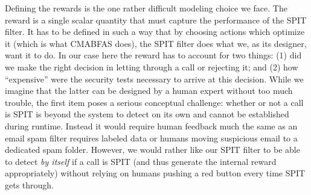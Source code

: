 \documentclass{llncs}
\begin{document}
Defining the rewards is the one rather difficult modeling choice we face. The reward
is a single scalar quantity that must capture the performance of the SPIT filter. It
has to be defined in such a way that by choosing actions which optimize it (which is what
CMABFAS does), the SPIT filter does what we, as its designer, want it to do.
In our case here the reward has to account for two things: (1) did we make the right decision
in letting through a call or rejecting it; and (2) how ``expensive'' were the security
tests necessary to arrive at this decision. While we imagine that the latter can be designed
by a human expert without too much trouble, the first item poses a serious conceptual
challenge: whether or not a call  is SPIT is beyond the system to detect
on its own and cannot be established during runtime. Instead it would require human
feedback much the same as an email spam filter requires labeled data or humans moving 
suspicious email to a dedicated spam folder. However, we would rather like our SPIT filter to be
able to detect {\em by itself} if a call is SPIT (and thus generate the internal reward 
appropriately) without relying on humans pushing a red button every time SPIT gets through.  
\end{document}
